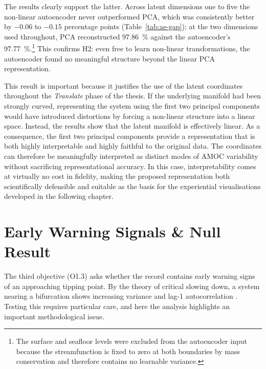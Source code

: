 The results clearly support the latter. Across latent dimensions one to five the non-linear autoencoder never outperformed PCA, which was consistently better by $-0.06$ to $-0.15$ percentage points (Table~\ref{tab:ae-gap}); at the two dimensions used throughout, PCA reconstructed \SI{97.86}{\percent} against the autoencoder's \SI{97.77}{\percent}.\footnote{The surface and seafloor levels were excluded from the autoencoder input because the streamfunction is fixed to zero at both boundaries by mass conservation and therefore contains no learnable variance.} This confirms H2: even free to learn non-linear transformations, the autoencoder found no meaningful structure beyond the linear PCA representation.




This result is important because it justifies the use of the latent coordinates throughout the \emph{Translate} phase of the thesis. If the underlying manifold had been strongly curved, representing the system using the first two principal components would have introduced distortions by forcing a non-linear structure into a linear space. Instead, the results show that the latent manifold is effectively linear. As a consequence, the first two principal components provide a representation that is both highly interpretable and highly faithful to the original data. The coordinates can therefore be meaningfully interpreted as distinct modes of AMOC variability without sacrificing representational accuracy. In this case, interpretability comes at virtually no cost in fidelity, making the proposed representation both scientifically defensible and suitable as the basis for the experiential visualisations developed in the following chapter.

\section{Early Warning Signals \& Null Result}
\label{sec:detect-ews}
 
The third objective (O1.3) asks whether the record contains early warning signs of an approaching tipping point. By the theory of critical slowing down, a system nearing a bifurcation shows increasing variance and lag-1 autocorrelation \citep{dakos2012, scheffer2009}. Testing this requires particular care, and here the analysis highlights an important methodological issue.

